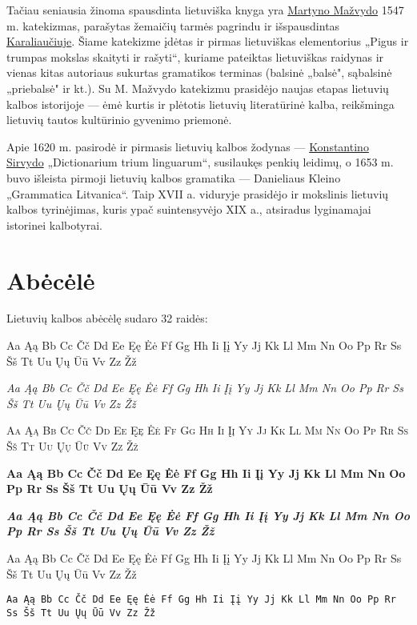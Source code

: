 \documentclass[a4paper]{article}
\begin{document}
Tačiau seniausia žinoma spausdinta lietuviška knyga yra 
\href{http://lt.wikipedia.org/wiki/Martynas_Ma%C5%BEvydas}{Martyno Mažvydo} 1547 m. katekizmas, parašytas 
žemaičių tarmės pagrindu ir išspausdintas 
\href{http://lt.wikipedia.org/wiki/Kaliningradas}{Karaliaučiuje}. Šiame katekizme įdėtas ir pirmas lietuviškas 
elementorius „Pigus ir trumpas mokslas skaityti ir rašyti“, kuriame pateiktas lietuviškas raidynas ir vienas 
kitas autoriaus sukurtas gramatikos terminas (balsinė „balsė", sąbalsinė „priebalsė" ir kt.). 
Su M. Mažvydo katekizmu prasidėjo naujas etapas lietuvių kalbos istorijoje — ėmė kurtis ir plėtotis 
lietuvių literatūrinė kalba, reikšminga lietuvių tautos kultūrinio gyvenimo priemonė.

Apie 1620 m. pasirodė ir pirmasis lietuvių kalbos žodynas — 
\href{http://lt.wikipedia.org/wiki/Konstantinas_Sirvydas}{Konstantino Sirvydo} „Dictionarium trium linguarum“, 
susilaukęs penkių leidimų, o 1653 m. buvo išleista pirmoji lietuvių kalbos gramatika — Danieliaus Kleino 
„Grammatica Litvanica“. Taip XVII a. viduryje prasidėjo ir mokslinis lietuvių kalbos tyrinėjimas, kuris 
ypač suintensyvėjo XIX a., atsiradus lyginamajai istorinei kalbotyrai.

\section{Abėcėlė}

Lietuvių kalbos abėcėlę sudaro 32 raidės:

Aa Ąą Bb Cc Čč Dd Ee Ęę Ėė Ff Gg Hh Ii Įį Yy Jj Kk Ll Mm Nn Oo Pp Rr Ss Šš Tt Uu Ųų Ūū Vv Zz Žž

\textit{Aa Ąą Bb Cc Čč Dd Ee Ęę Ėė Ff Gg Hh Ii Įį Yy Jj Kk Ll Mm Nn Oo Pp Rr Ss Šš Tt Uu Ųų Ūū Vv Zz Žž}

\textsc{Aa Ąą Bb Cc Čč Dd Ee Ęę Ėė Ff Gg Hh Ii Įį Yy Jj Kk Ll Mm Nn Oo Pp Rr Ss Šš Tt Uu Ųų Ūū Vv Zz Žž}

{\selectfont{Aa Ąą Bb Cc Čč Dd Ee Ęę Ėė Ff Gg Hh Ii Įį Yy Jj Kk Ll Mm Nn Oo Pp Rr Ss Šš Tt Uu Ųų Ūū Vv Zz Žž}}

\textbf{Aa Ąą Bb Cc Čč Dd Ee Ęę Ėė Ff Gg Hh Ii Įį Yy Jj Kk Ll Mm Nn Oo Pp Rr Ss Šš Tt Uu Ųų Ūū Vv Zz Žž}

\textbf{\textit{Aa Ąą Bb Cc Čč Dd Ee Ęę Ėė Ff Gg Hh Ii Įį Yy Jj Kk Ll Mm Nn Oo Pp Rr Ss Šš Tt Uu Ųų Ūū Vv Zz Žž}}

\textsf{Aa Ąą Bb Cc Čč Dd Ee Ęę Ėė Ff Gg Hh Ii Įį Yy Jj Kk Ll Mm Nn Oo Pp Rr Ss Šš Tt Uu Ųų Ūū Vv Zz Žž}

\texttt{Aa Ąą Bb Cc Čč Dd Ee Ęę Ėė Ff Gg Hh Ii Įį Yy Jj Kk Ll Mm Nn Oo Pp Rr Ss Šš Tt Uu Ųų Ūū Vv Zz Žž}
\end{document}
